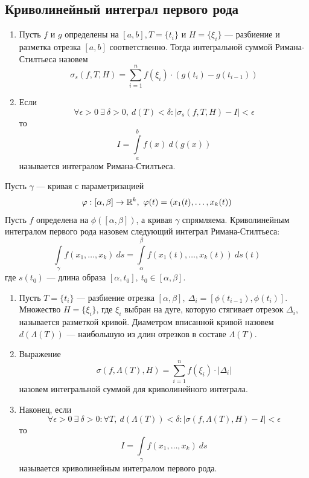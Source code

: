 \subsection{Криволинейный интеграл первого рода}
\begin{reminder}\tab
    \begin{enumerate}
        \item Пусть $f$ и $g$ определены на $[a,b], T=\{t_i\}$ и $H=\{\xi_i\}$ --- разбиение и разметка отрезка $[a,b]$ соответственно. Тогда интегральной суммой Римана-Стилтьеса назовем
        \[\sigma_s(f,T,H)=\sum\limits_{i=1}^{n}f(\xi_i)\cdot (g(t_i)-g(t_{i-1}))\]
        \item Если 
        \[\forall \epsilon>0\ \exists\ \delta>0,\ d(T)<\delta: |\sigma_s(f,T,H)-I|<\epsilon\]
        то
        \[I=\int\limits_{a}^{b}f(x)\ d(g(x))\]
        называется интегралом Римана-Стилтьеса.
    \end{enumerate}
\end{reminder}
\begin{definition}
    Пусть $\gamma$ --- кривая с параметризацией 
    \[\phi:[\alpha,\beta]\to \R^k,\ \phi(t)=(x_1(t),\dots,x_k(t))\]
    Пусть $f$ определена на $\phi([\alpha,\beta])$, а кривая $\gamma$ спрямляема. Криволинейным интегралом первого рода назовем следующий интеграл Римана-Стилтьеса:
    \[\int\limits_{\gamma}f(x_1,\dots,x_k)\ ds=\int\limits_{\alpha}^{\beta}f(x_1(t),\dots,x_k(t))\ ds(t)\]
    где $s(t_0)$ --- длина образа $[\alpha,t_0],\ t_0\in [\alpha,\beta]$.
\end{definition}
\begin{definition}\tab
    \begin{enumerate}
        \item Пусть $T=\{t_i\}$ --- разбиение отрезка $[\alpha,\beta],\ \Delta_i=[\phi(t_{i-1}),\phi(t_i)]$. Множество $H=\{\xi_i\}$, где $\xi_i$ выбран на дуге, которую стягивает отрезок $\Delta_i$, называется разметкой кривой. Диаметром вписанной кривой назовем $d(\Lambda(T))$ --- наибольшую из длин отрезков в составе $\Lambda(T)$.
        \item Выражение
        \[\sigma(f,\Lambda(T), H)=\sum\limits_{i=1}^{n}f(\xi_i)\cdot |\Delta_i|\]
        назовем интегральной суммой для криволинейного интеграла.
        \item Наконец, если
        \[\forall \epsilon>0\ \exists\ \delta>0: \forall T,\ d(\Lambda(T))<\delta: |\sigma(f,\Lambda(T), H)-I|<\epsilon\]
        то 
        \[I=\int\limits_{\gamma}f(x_1,\dots,x_k)\ ds\]
    называется криволинейным интегралом первого рода.
    \end{enumerate}
\end{definition}

